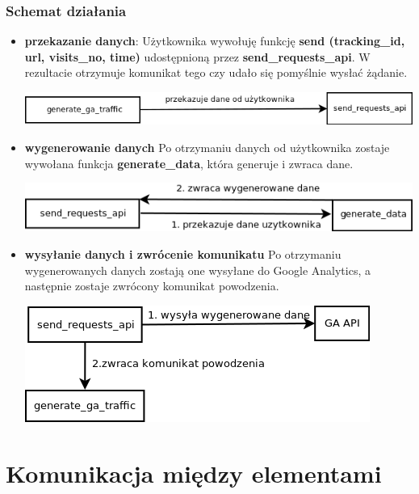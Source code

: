 \documentclass{article}
\begin{document}
\subsubsection{Schemat działania}

\begin{itemize}
\item \textbf{przekazanie danych}:
Użytkownika wywołuję funkcję \textbf{send (tracking\_id, url, visits\_no, time)} udostępnioną przez \textbf{send\_requests\_api}. W rezultacie otrzymuje komunikat tego czy udało się pomyślnie wysłać żądanie.

\begin{center}\includegraphics[scale=0.5]{put_data}\end{center}

\item \textbf{wygenerowanie danych}
Po otrzymaniu danych od użytkownika zostaje wywołana funkcja \textbf{generate\_data}, która generuje i zwraca dane. 

\begin{center}\includegraphics[scale=0.5]{generate_data}\end{center}

\item \textbf{wysyłanie danych i zwrócenie komunikatu}
Po otrzymaniu wygenerowanych danych zostają one wysyłane do Google Analytics, a następnie zostaje zwrócony komunikat powodzenia.

\begin{center}\includegraphics[scale=0.5]{send_data}\end{center}
\end{itemize}

\section{Komunikacja między elementami}
\end{document}
